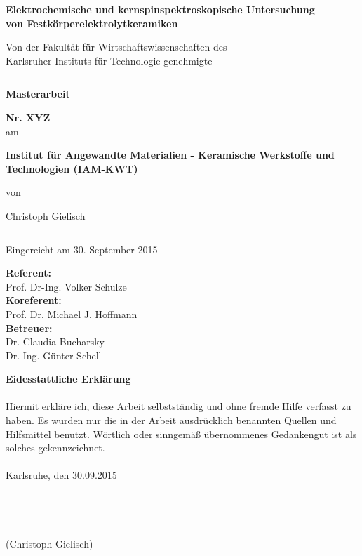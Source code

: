 \documentclass[a4paper, 11pt, headsepline,footsepline,twoside,abstract]{scrbook}
\begin{document}
\begin{center}
\textbf{\huge{ Elektrochemische und kern\-spin\-spek\-tros\-ko\-pische Untersuchung\\[0.4cm]von Festkörperelektrolytkeramiken}}
\end{center}
\begin{center}
\textbf{\Large{}}
\end{center}
\begin{center}
\large{Von der Fakultät für Wirtschaftswissenschaften des \\ Karlsruher Instituts für Technologie genehmigte }
\end{center}
\begin{verbatim}

\end{verbatim}
\begin{center}
\textbf{\LARGE{Masterarbeit}}
\end{center}
\begin{center}
\textbf{\Large{Nr. XYZ}}\\
am
\end{center}
\begin{center}
\textbf{\Large{Institut für Angewandte Materialien - Keramische Werkstoffe und Technologien (IAM-KWT)}}
\end{center}
\begin{center}
von
\end{center}
\begin{center}
\Large{Christoph Gielisch}
\end{center}
\begin{verbatim}
\end{verbatim}
\begin{center}
Eingereicht am 30. September 2015
\end{center}
\begin{center}
\textbf{Referent:} \\ Prof. Dr-Ing. Volker Schulze \\
\textbf{Koreferent:} \\ Prof. Dr. Michael J. Hoffmann\\
\textbf{Betreuer:} \\ Dr. Claudia Bucharsky \\ 
Dr.-Ing. Günter Schell \\
\end{center}
\newpage
\cleardoubleemptypage
\setcounter{page}{1}
\textbf{\Large{Eidesstattliche Erklärung}}
\\\\
Hiermit erkläre ich, diese Arbeit selbstständig und ohne fremde Hilfe verfasst zu haben. Es wurden nur die in der Arbeit ausdrücklich benannten Quellen und Hilfsmittel benutzt. Wörtlich oder sinngemäß übernommenes Gedankengut ist als solches gekennzeichnet.
\\\\
Karlsruhe, den 30.09.2015
\\\\
\\\\
\\
(Christoph Gielisch) 
 
\end{document}
